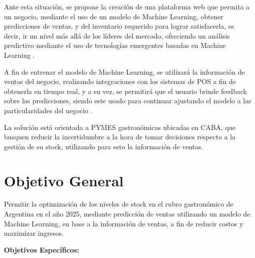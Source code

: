 Ante esta situación, se propone la creación de una plataforma web que permita a un negocio, mediante el uso de un modelo de Machine Learning, obtener predicciones de ventas, y del inventario requerido para lograr satisfacerla, es decir, ir un nivel más allá de los líderes del mercado, ofreciendo un análisis predictivo mediante el uso de tecnologías emergentes basadas en Machine Learning \parencite{posch2022bayesian}.

A fin de entrenar el modelo de Machine Learning, se utilizará la información de ventas del negocio, realizando integraciones con los sistemas de POS a fin de obtenerla en tiempo real, y a su vez, se permitirá que el usuario brinde feedback sobre las predicciones, siendo este usado para continuar ajustando el modelo a las particularidades del negocio \parencite{soto2024futuro}.

La solución está orientada a PYMES gastronómicas ubicadas en CABA, que busquen reducir la incertidumbre a la hora de tomar decisiones respecto a la gestión de su stock, utilizando para esto la información de ventas.

\section{Objetivo General}

Permitir la optimización de los niveles de stock en el rubro gastronómico de Argentina en el año 2025, mediante predicción de ventas utilizando un modelo de Machine Learning, en base a la información de ventas, a fin de reducir costos y maximizar ingresos.

\noindent\textbf{Objetivos Específicos:}

